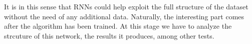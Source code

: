 \documentclass[]{article}
\begin{document}
It is in this sense that RNNs could help exploit the full structure of the dataset without the need of any additional data. Naturally, the interesting part comes after the algorithm has been trained. At this stage we have to analyze the strcuture of this network, the results it produces, among other tests.



\renewcommand\refname{Referencias}


\end{document}
